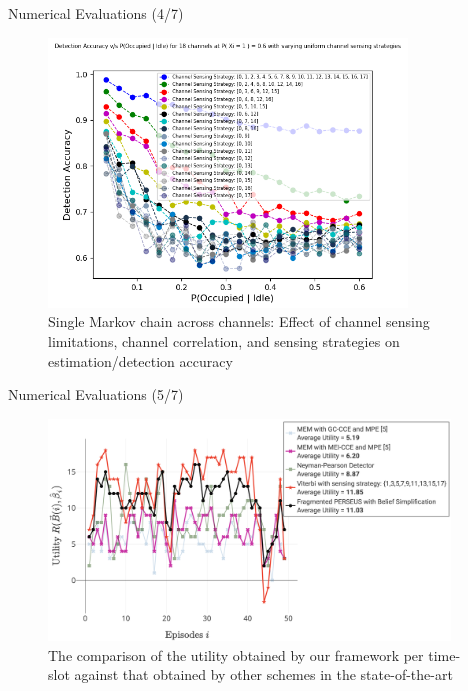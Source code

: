 \documentclass{beamer}
\begin{document}
\begin{frame}{Numerical Evaluations (4/7)}
    \begin{figure}
    \centering
    \includegraphics[width = 0.85\textwidth]{Uniform_Channel_Sensing.png}
    \caption{Single Markov chain across channels: Effect of channel sensing limitations, channel correlation, and sensing strategies on estimation/detection accuracy}
    \label{fig:32}
\end{figure}
\end{frame}
\begin{frame}{Numerical Evaluations (5/7)}
    \begin{figure}
    \centering
    \includegraphics[width = 0.95\textwidth]{PerformanceEvaluation.png}
    \caption{The comparison of the utility obtained by our framework per time-slot against that obtained by other schemes in the state-of-the-art}
    \label{fig:33}
\end{figure}
\end{frame}
\end{document}
